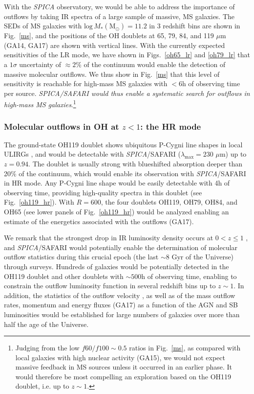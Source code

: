 \documentclass{pasa}%
\begin{document}
With the {\it SPICA} observatory, we would be able to address the
importance of outflows by 
taking IR spectra of a large sample of massive, MS galaxies.
The SEDs of MS galaxies 
with $\mathrm{log}\,M_*(\mathrm{M_{\odot}})=11.2$ in 3 redshift bins are shown
in Fig.~\ref{ms}, and the positions of the OH doublets at 65, 79, 84, and 119
$\mu$m (GA14, GA17) are shown with vertical
lines. With the currently expected sensitivities of the LR mode, we have shown
in Figs.~\ref{oh65_lr} and \ref{oh79_lr} that a $1\sigma$ uncertainty of
$\approx2$\% of the continuum would enable the detection of massive molecular
outflows. We thus show in Fig.~\ref{ms} that 
this level of sensitivity is reachable for high-mass MS galaxies with 
$<6$h of observing time per source. 
{\em SPICA/SAFARI would thus enable a systematic search for
  outflows in high-mass MS galaxies}.\footnote{Judging from the low 
  $f60/f100\sim0.5$ ratios in Fig.~\ref{ms}, as compared with local galaxies
  with high nuclear activity (GA15), we would not expect massive feedback in
  MS sources unless it occurred in an earlier phase. It would therefore be
  most compelling an exploration based on the OH119 doublet, i.e. up to
  $z\sim1$.} 

\subsubsection{Molecular outflows in OH at $z<1$: the HR mode}
\label{sec:lowz}


The ground-state OH119 doublet shows ubiquitous P-Cygni line shapes in
local ULIRGs \citep{spo13,vei13}, and would be detectable with 
{\it SPICA}/SAFARI ($\lambda_{\mathrm{max}}=230$ $\mu$m) up to $z=0.94$. 
The doublet is usually strong with blueshifted absorption deeper than 20\% 
of the continuum, which would enable its observation with {\it SPICA}/SAFARI
in HR mode. Any P-Cygni line shape 
would be easily detectable with 4h of observing time, providing high-quality
spectra in this doublet (see Fig.~\ref{oh119_hr}). With $R=600$, the four
doublets OH119, OH79, OH84, and OH65 (see lower panels of
Fig.~\ref{oh119_hr}) would be analyzed enabling an estimate of the energetics 
associated with the outflows (GA17).

We remark that the strongest drop in IR luminosity density occurs at
$0<z\le1$ \citep{gru13}, and {\it SPICA}/SAFARI would potentially 
enable the determination of molecular outflow statistics during this crucial
epoch (the last $\sim8$ Gyr of the Universe) through surveys. Hundreds of
galaxies would be potentially detected in the OH119 doublet and other doublets
with $\sim500$h of observing time, enabling to constrain the outflow
luminosity function in several redshift bins up to $z\sim1$.  
In addition, the statistics of the outflow velocity
\citep{stu11,spo13,vei13,sto16}, as well as of the mass  
outflow rates, momentum and energy fluxes (GA17) as a function of
the AGN and SB luminosities would be established 
for large numbers of galaxies over more than half the age of the
  Universe.
\end{document}

